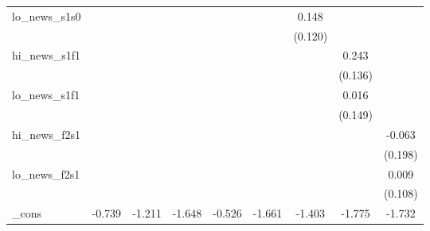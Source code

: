 {\begin{tabular}{l*{8}{c}}
\addlinespace
lo\_news\_s1s0&                     &                     &                     &                     &                     &       0.148         &                     &                     \\
            &                     &                     &                     &                     &                     &     (0.120)         &                     &                     \\
\addlinespace
hi\_news\_s1f1&                     &                     &                     &                     &                     &                     &       0.243\sym{*}  &                     \\
            &                     &                     &                     &                     &                     &                     &     (0.136)         &                     \\
\addlinespace
lo\_news\_s1f1&                     &                     &                     &                     &                     &                     &       0.016         &                     \\
            &                     &                     &                     &                     &                     &                     &     (0.149)         &                     \\
\addlinespace
hi\_news\_f2s1&                     &                     &                     &                     &                     &                     &                     &      -0.063         \\
            &                     &                     &                     &                     &                     &                     &                     &     (0.198)         \\
\addlinespace
lo\_news\_f2s1&                     &                     &                     &                     &                     &                     &                     &       0.009         \\
            &                     &                     &                     &                     &                     &                     &                     &     (0.108)         \\
\addlinespace
\_cons      &      -0.739         &      -1.211         &      -1.648\sym{***}&      -0.526         &      -1.661\sym{***}&      -1.403\sym{***}&      -1.775\sym{***}&      -1.732\sym{***}\\

\end{tabular}}
